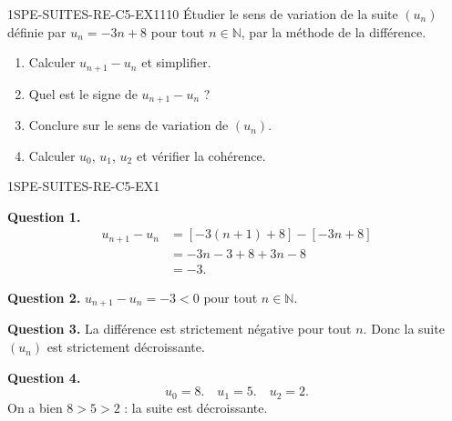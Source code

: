 


\begin{exercice}{1SPE-SUITES-RE-C5-EX1}{1}{10}
Étudier le sens de variation de la suite $(u_n)$ définie par $u_n = -3n + 8$ pour tout $n \in \mathbb{N}$, par la méthode de la différence.
\begin{enumerate}
  \item Calculer $u_{n+1} - u_n$ et simplifier.
  \item Quel est le signe de $u_{n+1} - u_n$ ?
  \item Conclure sur le sens de variation de $(u_n)$.
  \item Calculer $u_0$, $u_1$, $u_2$ et vérifier la cohérence.
\end{enumerate}
\end{exercice}


\begin{corrige}{1SPE-SUITES-RE-C5-EX1}


\textbf{Question 1.}
\begin{align*}
u_{n+1} - u_n &= [-3(n+1) + 8] - [-3n + 8] \\
               &= -3n - 3 + 8 + 3n - 8 \\
               &= -3.
\end{align*}

\textbf{Question 2.} $u_{n+1} - u_n = -3 < 0$ pour tout $n \in \mathbb{N}$.


\textbf{Question 3.} La différence est strictement négative pour tout $n$. Donc la suite $(u_n)$ est strictement décroissante.

\textbf{Question 4.}
\[
u_0 = 8. \quad u_1 = 5. \quad u_2 = 2.
\]
On a bien $8 > 5 > 2$ : la suite est décroissante. \checkmark

\end{corrige}

